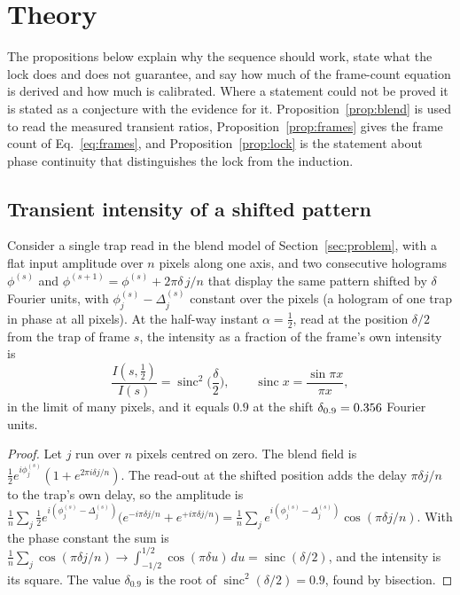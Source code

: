 \section{Theory}\label{sec:theory}

The propositions below explain why the sequence should work, state what the lock does and does not guarantee, and say how much of the frame-count equation is derived and how much is calibrated. Where a statement could not be proved it is stated as a conjecture with the evidence for it. Proposition~\ref{prop:blend} is used to read the measured transient ratios, Proposition~\ref{prop:frames} gives the frame count of Eq.~\ref{eq:frames}, and Proposition~\ref{prop:lock} is the statement about phase continuity that distinguishes the lock from the induction.

\subsection{Transient intensity of a shifted pattern}

\begin{proposition}\label{prop:blend}
Consider a single trap read in the blend model of Section~\ref{sec:problem}, with a flat input amplitude over $n$ pixels along one axis, and two consecutive holograms $\phi^{(s)}$ and $\phi^{(s+1)}=\phi^{(s)}+2\pi\delta\,j/n$ that display the same pattern shifted by $\delta$ Fourier units, with $\phi_j^{(s)}-\Delta_j^{(s)}$ constant over the pixels (a hologram of one trap in phase at all pixels). At the half-way instant $\alpha=\tfrac12$, read at the position $\delta/2$ from the trap of frame $s$, the intensity as a fraction of the frame's own intensity is
\begin{equation}
\frac{I(s,\tfrac12)}{I(s)}=\operatorname{sinc}^2\!\Big(\frac\delta2\Big),\qquad \operatorname{sinc}x=\frac{\sin\pi x}{\pi x},\label{eq:sinc}
\end{equation}
in the limit of many pixels, and it equals $0.9$ at the shift $\delta_{0.9}=0.356{}$ Fourier units.
\end{proposition}
\begin{proof}
Let $j$ run over $n$ pixels centred on zero. The blend field is $\tfrac12e^{i\phi_j^{(s)}}(1+e^{2\pi i\delta j/n})$. The read-out at the shifted position adds the delay $\pi\delta j/n$ to the trap's own delay, so the amplitude is $\frac1n\sum_j\tfrac12e^{i(\phi_j^{(s)}-\Delta_j^{(s)})}\big(e^{-i\pi\delta j/n}+e^{+i\pi\delta j/n}\big)=\frac1n\sum_je^{i(\phi_j^{(s)}-\Delta_j^{(s)})}\cos(\pi\delta j/n)$. With the phase constant the sum is $\frac1n\sum_j\cos(\pi\delta j/n)\to\int_{-1/2}^{1/2}\cos(\pi\delta u)\,du=\operatorname{sinc}(\delta/2)$, and the intensity is its square. The value $\delta_{0.9}$ is the root of $\operatorname{sinc}^2(\delta/2)=0.9$, found by bisection.
\end{proof}

